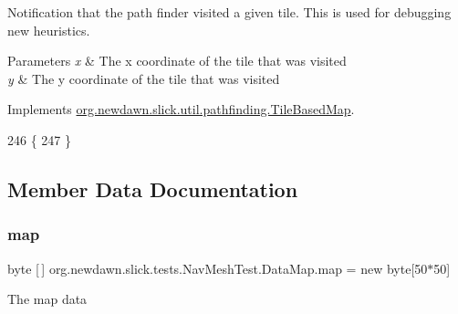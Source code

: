 Notification that the path finder visited a given tile. This is used for debugging new heuristics.


\begin{DoxyParams}{Parameters}
{\em x} & The x coordinate of the tile that was visited \\
\hline
{\em y} & The y coordinate of the tile that was visited \\
\hline
\end{DoxyParams}


Implements \mbox{\hyperlink{interfaceorg_1_1newdawn_1_1slick_1_1util_1_1pathfinding_1_1_tile_based_map_aeb1c1b5cbb0aecc4e280dbe18d5af5ac}{org.\+newdawn.\+slick.\+util.\+pathfinding.\+Tile\+Based\+Map}}.


\begin{DoxyCode}
246                                                     \{
247         \}
\end{DoxyCode}


\subsection{Member Data Documentation}
\mbox{\label{classorg_1_1newdawn_1_1slick_1_1tests_1_1_nav_mesh_test_1_1_data_map_a53320b21368a0f1e144396488d4ae3ee}} 
\subsubsection{\texorpdfstring{map}{map}}
{\footnotesize\ttfamily byte \mbox{[}$\,$\mbox{]} org.\+newdawn.\+slick.\+tests.\+Nav\+Mesh\+Test.\+Data\+Map.\+map = new byte\mbox{[}50$\ast$50\mbox{]}\hspace{0.3cm}{\ttfamily [private]}}

The map data 
